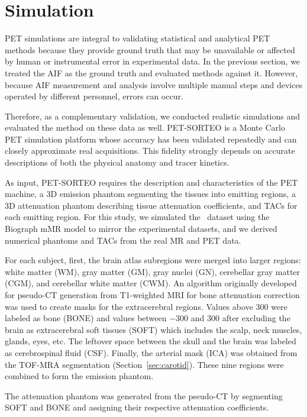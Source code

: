 \section{Simulation}
PET simulations are integral to validating statistical and analytical PET methods because they provide ground truth that may be unavailable or affected by human or instrumental error in experimental data.
In the previous section, we treated the AIF as the ground truth and evaluated methods against it.
However, because AIF measurement and analysis involve multiple manual steps and devices operated by different personnel, errors can occur.

Therefore, as a complementary validation, we conducted realistic simulations and evaluated the method on these data as well.
PET-SORTEO is a Monte Carlo PET simulation platform \cite{TODO} whose accuracy has been validated repeatedly \cite{TODO,TODO} and can closely approximate real acquisitions.
This fidelity strongly depends on accurate descriptions of both the physical anatomy and tracer kinetics.

As input, PET-SORTEO requires the description and characteristics of the PET machine, a 3D emission phantom segmenting the tissues into emitting regions, a 3D attenuation phantom describing tissue attenuation coefficients, and TACs for each emitting region.
For this study, we simulated the \fdg\ dataset using the Biograph mMR model to mirror the experimental datasets, and we derived numerical phantoms and TACs from the real MR and PET data.

For each subject, first, the brain atlas subregions were merged into larger regions: white matter (WM), gray matter (GM), gray nuclei (GN), cerebellar gray matter (CGM), and cerebellar white matter (CWM).
An algorithm originally developed for pseudo-CT generation from T1-weighted MRI for bone attenuation correction was used to create masks for the extracerebral regions\cite{TODO}.
Values above 300 were labeled as bone (BONE) and values between \(-300\) and \(300\) after excluding the brain as extracerebral soft tissues (SOFT) which includes the scalp, neck muscles, glands, eyes, etc.
The leftover space between the skull and the brain was labeled as cerebrospinal fluid (CSF).
Finally, the arterial mask (ICA) was obtained from the TOF-MRA segmentation (Section~\ref{sec:carotid}).
These nine regions were combined to form the emission phantom.

The attenuation phantom was generated from the pseudo-CT by segmenting SOFT and BONE and assigning their respective attenuation coefficients.

